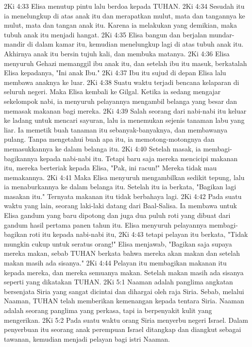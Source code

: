 2Ki 4:33  Elisa menutup pintu lalu berdoa kepada TUHAN.
2Ki 4:34  Sesudah itu ia menelungkup di atas anak itu dan merapatkan mulut, mata dan tangannya ke mulut, mata dan tangan anak itu. Karena ia melakukan yang demikian, maka tubuh anak itu menjadi hangat.
2Ki 4:35  Elisa bangun dan berjalan mundar-mandir di dalam kamar itu, kemudian menelungkup lagi di atas tubuh anak itu. Akhirnya anak itu bersin tujuh kali, dan membuka matanya.
2Ki 4:36  Elisa menyuruh Gehazi memanggil ibu anak itu, dan setelah ibu itu masuk, berkatalah Elisa kepadanya, "Ini anak Ibu."
2Ki 4:37  Ibu itu sujud di depan Elisa lalu membawa anaknya ke luar.
2Ki 4:38  Suatu waktu terjadi bencana kelaparan di seluruh negeri. Maka Elisa kembali ke Gilgal. Ketika ia sedang mengajar sekelompok nabi, ia menyuruh pelayannya mengambil belanga yang besar dan memasak makanan bagi mereka.
2Ki 4:39  Salah seorang dari nabi-nabi itu keluar ke ladang untuk mencari sayuran, lalu ia menemukan sejenis tanaman labu yang liar. Ia memetik buah tanaman itu sebanyak-banyaknya, dan membawanya pulang. Tanpa mengetahui buah apa itu, ia memotong-motongnya dan memasukkannya ke dalam belanga itu.
2Ki 4:40  Setelah masak, ia membagi-bagikannya kepada nabi-nabi itu. Tetapi baru saja mereka mencicipi makanan itu, mereka berteriak kepada Elisa, "Pak, ini racun!" Mereka tidak mau memakannya.
2Ki 4:41  Maka Elisa menyuruh mengambilkan sedikit tepung, lalu ia menaburkannya ke dalam belanga itu. Setelah itu ia berkata, "Bagikan lagi masakan itu." Ternyata makanan itu tidak berbahaya lagi.
2Ki 4:42  Pada suatu waktu yang lain, seorang laki-laki datang dari Baal-Salisa. Ia membawa untuk Elisa gandum yang baru dipotong dan juga dua puluh roti yang dibuat dari gandum hasil pertama panen tahun itu. Elisa menyuruh pelayannya membagi-bagikan roti itu kepada nabi-nabi itu,
2Ki 4:43  tetapi pelayan itu berkata, "Tidak mungkin cukup untuk seratus orang!" Elisa menjawab, "Bagikan saja supaya mereka makan, sebab TUHAN berkata bahwa mereka akan makan dan setelah makan masih ada sisanya."
2Ki 4:44  Pelayan itu membagikan makanan itu kepada mereka, dan mereka semuanya makan. Setelah makan masih ada sisanya seperti yang dikatakan TUHAN.
2Ki 5:1  Naaman adalah panglima angkatan bersenjata Siria yang sangat dicintai dan dihargai oleh raja Siria. Sebab, melalui Naaman, TUHAN telah memberikan kemenangan kepada tentara Siria. Naaman adalah seorang panglima yang perkasa, tapi ia berpenyakit kulit yang mengerikan.
2Ki 5:2  Pada suatu waktu orang Siria menyerbu negeri Israel. Dalam penyerbuan itu seorang anak perempuan Israel ditangkap dan diangkut sebagai tawanan, kemudian menjadi pelayan bagi istri Naaman.
